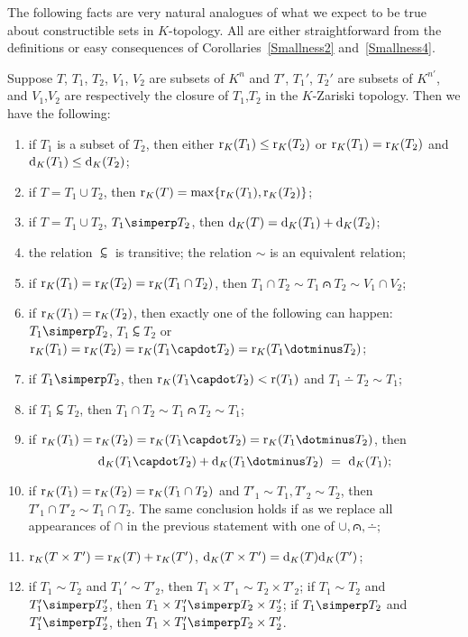 The following facts are very natural analogues of what we expect to be true about constructible sets in $K$-topology. All are either straightforward from the definitions or easy consequences of Corollaries~\ref{Smallness2} and~\ref{Smallness4}.
\begin{prop} \label{lies}
Suppose $T$, $T_1$, $T_2$, $V_1$, $V_2$ are subsets of $ K^n$ and $T'$, $T_1'$, $T_2'$ are subsets of $K^{n'}$, and $V_1$,$V_2$ are respectively the closure of $T_1$,$T_2$ in the $K$-Zariski topology. Then we have the following:
\begin{enumerate}
\item if $T_1$ is a subset of $T_2$, then either $\mathrm{r}_K(T_1) \leq \mathrm{r}_K(T_2)$ or $\mathrm{r}_K(T_1) = \mathrm{r}_K(T_2)$ and $\mathrm{d}_K(T_1) \leq \mathrm{d}_K(T_2)$;
\item if $T = T_1 \cup T_2$, then $\mathrm{r}_K(T) = \max\{ \mathrm{r}_K(T_1), \mathrm{r}_K(T_2)\} $;
\item if $T = T_1 \cup T_2$, $T_1 \simperp T_2$, then $\mathrm{d}_K(T) = \mathrm{d}_K(T_1)+\mathrm{d}_K(T_2)$;
\item the relation $\subsim$ is transitive; the relation $\sim$ is an equivalent relation;
\item if $\mathrm{r}_K(T_1)=\mathrm{r}_K(T_2)= \mathrm{r}_K(T _1 \cap T_2)$, then $T_1 \cap T_2 \sim T_1 \capdot T_2 \sim V_1 \cap V_2$;
\item if $\mathrm{r}_K(T_1) = \mathrm{r}_K(T_2)$, then exactly one of the following can happen: $T_1 \simperp T_2$, $T_1 \subsim T_2$ or $\mr_K(T_1)=\mr_K(T_2)= \mr_K(T _1 \capdot T_2) = \mr_K( T_1 \dotminus T_2)$;
\item if $T_1 \simperp T_2$, then $\mr_K(T_1 \capdot T_2) < \mr(T_1) $ and $T_1 \dotminus T_2 \sim T_1$;
\item if $T_1 \subsim T_2$, then $ T_1 \cap T_2 \sim T_1 \capdot T_2 \sim T_1$;
\item if $\mr_K(T_1)=\mr_K(T_2)= \mr_K(T _1 \capdot T_2) = \mr_K( T_1 \dotminus T_2)$, then 
$$\md_K(T _1 \capdot T_2)+\md_K(T_1 \dotminus T_2) \ =\ \md_K(T_1);$$
\item if $\mathrm{r}_K(T_1)= \mathrm{r}_K(T_2) = \mathrm{r}_K(T_1 \cap T_2)$ and $T'_1 \sim T_1, T'_2 \sim T_2$, then $T'_1 \cap T'_2 \sim T_1 \cap T_2$. The same conclusion holds if as we replace all appearances of $\cap$ in the previous statement with one of $\cup, \capdot, \dotminus$;
\item $\mathrm{r}_K( T \times T') = \mathrm{r}_K(T) + \mathrm{r}_K(T')$, $ \mathrm{d}_K( T \times T') = \mathrm{d}_K(T)\mathrm{d}_K(T')$;
\item if $T_1  \sim T_2$ and $T_1' \sim T'_2$, then $T_1 \times T'_1 \sim T_2 \times T'_2$; if $T_1 \sim T_2$ and $T'_1 \simperp T'_2$, then $T_1 \times T'_1 \simperp T_2 \times T'_2$; if   $T_1 \simperp T_2$ and $T'_1 \simperp T'_2$, then $T_1 \times T'_1 \simperp T_2 \times T'_2$.
\end{enumerate}
\end{prop}












